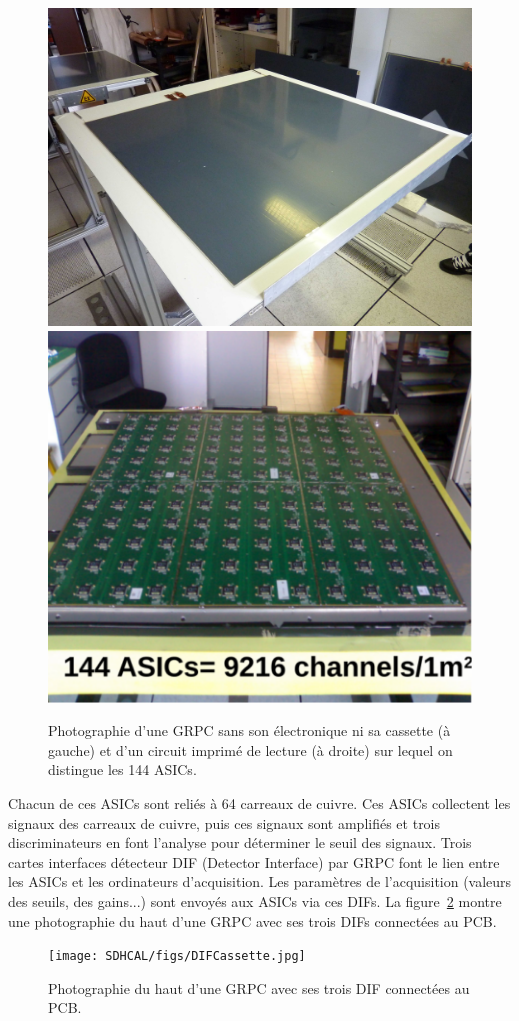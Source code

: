 \begin{figure}[!h]
  \begin{center}
    \includegraphics[width=.47\textwidth]{SDHCAL/figs/aLayer.jpg}
    \includegraphics[width=.4\textwidth]{SDHCAL/figs/layer_electronic2.pdf}
    \caption{Photographie d'une GRPC sans son électronique ni sa cassette (à gauche) et d'un circuit imprimé de lecture (à droite) sur lequel on distingue les 144 ASICs.}
    \label{fig:layer}
  \end{center}
\end{figure}
Chacun de ces ASICs sont reliés à 64 carreaux de cuivre. Ces ASICs collectent les signaux des carreaux de cuivre, puis ces signaux sont amplifiés et trois discriminateurs en font l'analyse pour déterminer le seuil des signaux. Trois cartes interfaces détecteur DIF (Detector Interface) par GRPC font le lien entre les ASICs et les ordinateurs d'acquisition. Les paramètres de l'acquisition (valeurs des seuils, des gains...) sont envoyés aux ASICs via ces DIFs. La figure~\ref{fig:DIF} montre une photographie du haut d'une GRPC avec ses trois DIFs connectées au PCB.
\begin{figure}[!h]
  \begin{center}
    \texttt{[image: SDHCAL/figs/DIFCassette.jpg]}
    \caption{Photographie du haut d'une GRPC avec ses trois DIF connectées au PCB.}
    \label{fig:DIF}
  \end{center}
\end{figure}

